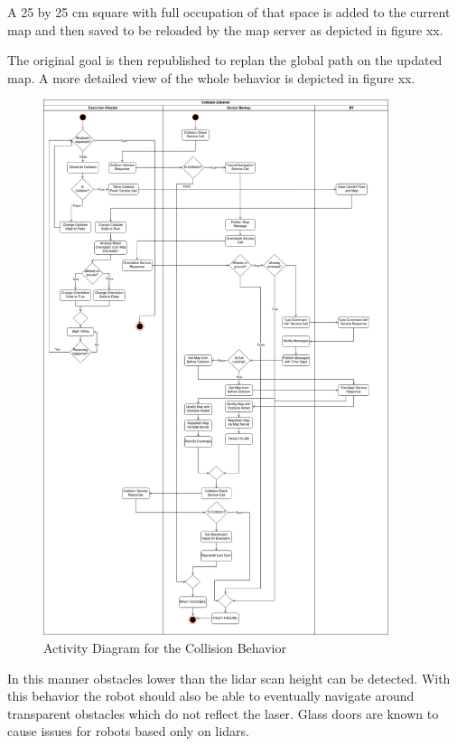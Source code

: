 A 25 by 25 cm square with full occupation of that space is added to the current map and then saved to be reloaded by the map server as depicted in figure xx. 

The original goal is then republished to replan the global path on the updated map. A more detailed view of the whole behavior is depicted in figure xx.

\begin{figure}
	\includegraphics[width=0.9\textwidth]{images/activity_diagram_collision.png}
	\caption{Activity Diagram for the Collision Behavior}
\end{figure}

In this manner obstacles lower than the lidar scan height can be detected. With this behavior the robot should also be able to eventually navigate around transparent obstacles which do not reflect the laser. Glass doors are known to cause issues for robots based only on lidars. 

